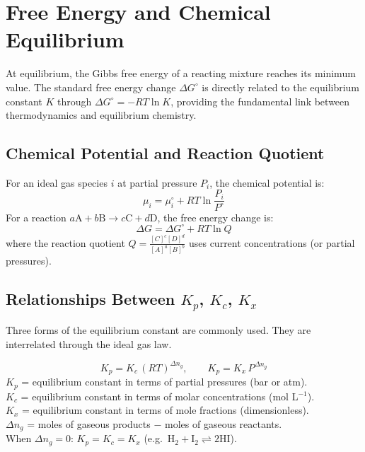 \documentclass[12pt,a4paper]{article}
\begin{document}
\section{Free Energy and Chemical Equilibrium}

\begin{tcolorbox}[defbox]
At equilibrium, the Gibbs free energy of a reacting mixture reaches its minimum value. The standard free energy change $\Delta G^\circ$ is directly related to the equilibrium constant $K$ through $\Delta G^\circ = -RT\ln K$, providing the fundamental link between thermodynamics and equilibrium chemistry.
\end{tcolorbox}

\subsection{Chemical Potential and Reaction Quotient}
For an ideal gas species $i$ at partial pressure $P_i$, the chemical potential is:
\[
\mu_i = \mu_i^\circ + RT\ln\frac{P_i}{P^\circ}
\]
For a reaction $a\mathrm{A} + b\mathrm{B} \to c\mathrm{C} + d\mathrm{D}$, the free energy change is:
\[
\Delta G = \Delta G^\circ + RT\ln Q
\]
where the reaction quotient $Q = \frac{[C]^c[D]^d}{[A]^a[B]^b}$ uses current concentrations (or partial pressures).

\subsection{Relationships Between \texorpdfstring{$K_p$, $K_c$, $K_x$}{Kp, Kc, Kx}}
Three forms of the equilibrium constant are commonly used. They are interrelated through the ideal gas law.

\begin{tcolorbox}[formulabox, title={Equilibrium Constant Relationships}]
\[
K_p = K_c\,(RT)^{\Delta n_g}, \qquad K_p = K_x\,P^{\Delta n_g}
\]
$K_p$ = equilibrium constant in terms of partial pressures (bar or atm).\\
$K_c$ = equilibrium constant in terms of molar concentrations (mol L$^{-1}$).\\
$K_x$ = equilibrium constant in terms of mole fractions (dimensionless).\\
$\Delta n_g$ = moles of gaseous products $-$ moles of gaseous reactants.\\
When $\Delta n_g = 0$: $K_p = K_c = K_x$ (e.g.\ $\mathrm{H_2 + I_2 \rightleftharpoons 2HI}$).
\end{tcolorbox}
\end{document}
